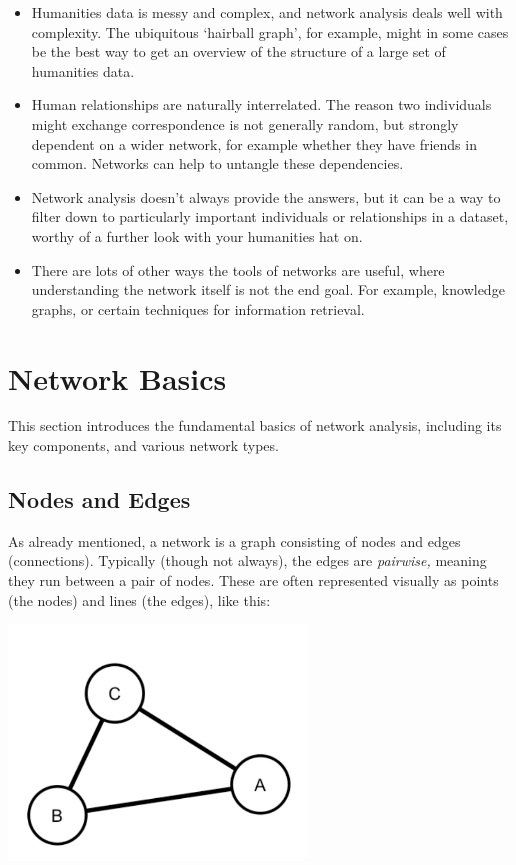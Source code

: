 \documentclass[
]{book}
\begin{document}
\begin{itemize}
\item
  Humanities data is messy and complex, and network analysis deals well with complexity. The ubiquitous `hairball graph', for example, might in some cases be the best way to get an overview of the structure of a large set of humanities data.
\item
  Human relationships are naturally interrelated. The reason two individuals might exchange correspondence is not generally random, but strongly dependent on a wider network, for example whether they have friends in common. Networks can help to untangle these dependencies.
\item
  Network analysis doesn't always provide the answers, but it can be a way to filter down to particularly important individuals or relationships in a dataset, worthy of a further look with your humanities hat on.
\item
  There are lots of other ways the tools of networks are useful, where understanding the network itself is not the end goal. For example, knowledge graphs, or certain techniques for information retrieval.
\end{itemize}

\hypertarget{network-basics}{%
\section{Network Basics}\label{network-basics}}

This section introduces the fundamental basics of network analysis, including its key components, and various network types.

\hypertarget{nodes-and-edges}{%
\subsection{Nodes and Edges}\label{nodes-and-edges}}

As already mentioned, a network is a graph consisting of nodes and edges (connections). Typically (though not always), the edges are \emph{pairwise,} meaning they run between a pair of nodes. These are often represented visually as points (the nodes) and lines (the edges), like this:

\includegraphics[width=3.125in,height=\textheight]{images/Screenshot 2022-09-26 at 11.42.32.png}
\end{document}

